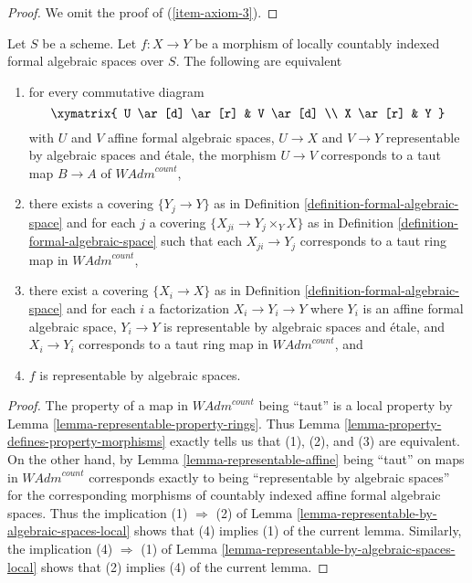 \begin{proof}
\medskip\noindent
We omit the proof of (\ref{item-axiom-3}).
\end{proof}

\begin{lemma}
\label{lemma-representable-local-property}
Let $S$ be a scheme. Let $f : X \to Y$ be a morphism of
locally countably indexed formal algebraic spaces over $S$.
The following are equivalent
\begin{enumerate}
\item for every commutative diagram
$$
\xymatrix{
U \ar[d] \ar[r] & V \ar[d] \\
X \ar[r] & Y
}
$$
with $U$ and $V$ affine formal algebraic spaces, $U \to X$ and $V \to Y$
representable by algebraic spaces and \'etale, the morphism $U \to V$
corresponds to a taut map $B \to A$ of $\textit{WAdm}^{count}$,
\item there exists a covering $\{Y_j \to Y\}$ as in
Definition \ref{definition-formal-algebraic-space} and for each $j$
a covering $\{X_{ji} \to Y_j \times_Y X\}$ as in
Definition \ref{definition-formal-algebraic-space}
such that each $X_{ji} \to Y_j$  corresponds
to a taut ring map in $\textit{WAdm}^{count}$,
\item there exist a covering $\{X_i \to X\}$ as in
Definition \ref{definition-formal-algebraic-space}
and for each $i$ a factorization $X_i \to Y_i \to Y$ where $Y_i$
is an affine formal algebraic space, $Y_i \to Y$ is representable
by algebraic spaces and \'etale, and $X_i \to Y_i$ corresponds
to a taut ring map in $\textit{WAdm}^{count}$, and
\item $f$ is representable by algebraic spaces.
\end{enumerate}
\end{lemma}

\begin{proof}
The property of a map in $\textit{WAdm}^{count}$ being
``taut'' is a local property by
Lemma \ref{lemma-representable-property-rings}.
Thus Lemma \ref{lemma-property-defines-property-morphisms}
exactly tells us that (1), (2), and (3) are equivalent.
On the other hand, by Lemma \ref{lemma-representable-affine}
being ``taut'' on maps in $\textit{WAdm}^{count}$ corresponds exactly to being
``representable by algebraic spaces'' for the corresponding morphisms of
countably indexed affine formal algebraic spaces.
Thus the implication (1) $\Rightarrow$ (2) of
Lemma \ref{lemma-representable-by-algebraic-spaces-local}
shows that (4) implies (1) of the current lemma.
Similarly, the implication (4) $\Rightarrow$ (1) of
Lemma \ref{lemma-representable-by-algebraic-spaces-local}
shows that (2) implies (4) of the current lemma.
\end{proof}









